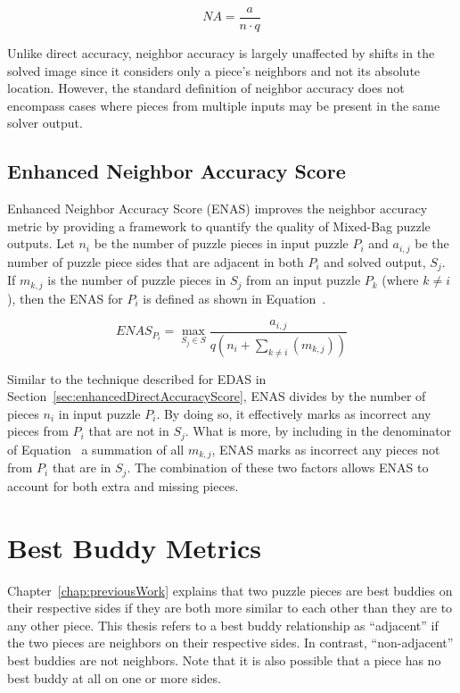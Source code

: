 \begin{equation} \label{eq:neighborAccuracy}
  NA = \frac{a}{n \cdot q}
\end{equation}

Unlike direct accuracy, neighbor accuracy is largely unaffected by shifts in the solved image since it considers only a piece's neighbors and not its absolute location.  However, the standard definition of neighbor accuracy does not encompass cases where pieces from multiple inputs may be present in the same solver output.  

\subsection{Enhanced Neighbor Accuracy Score}\label{sec:enhancedNeighborAccuracyScore}

Enhanced Neighbor Accuracy Score (ENAS) improves the neighbor accuracy metric by providing a framework to quantify the quality of Mixed-Bag puzzle outputs.   Let $n_i$ be the number of puzzle pieces in input puzzle $P_i$ and $a_{i,j}$ be the number of puzzle piece sides that are adjacent in both $P_i$ and solved output, $S_j$.  If $m_{k,j}$ is the number of puzzle pieces in $S_j$ from an input puzzle $P_k$ (where $k \ne i$), then the ENAS for $P_i$ is defined as shown in Equation~.

\begin{equation} \label{eq:enhancedNeighborAccuracyScore}
  ENAS_{P_i} = \max\limits_{S_j \in S}\frac{a_{i,j}}{q (n_i + \sum_{k \ne i}(m_{k,j}))}
\end{equation}

Similar to the technique described for EDAS in Section~\ref{sec:enhancedDirectAccuracyScore}, ENAS divides by the number of pieces $n_i$ in input puzzle $P_i$.  By doing so, it effectively marks as incorrect any pieces from $P_i$ that are not in $S_j$.  What is more, by including in the denominator of Equation~ a summation of all $m_{k,j}$, ENAS marks as incorrect any pieces not from $P_i$ that are in $S_j$.  The combination of these two factors allows ENAS to account for both extra and missing pieces.

\section{Best Buddy Metrics}\label{sec:bestBuddyMetrics}

Chapter~\ref{chap:previousWork} explains that two puzzle pieces are best buddies on their respective sides if they are both more similar to each other than they are to any other piece.  This thesis refers to a best buddy relationship as ``adjacent'' if the two pieces are neighbors on their respective sides.  In contrast, ``non-adjacent'' best buddies are not neighbors.  Note that it is also possible that a piece has no best buddy at all on one or more sides.

